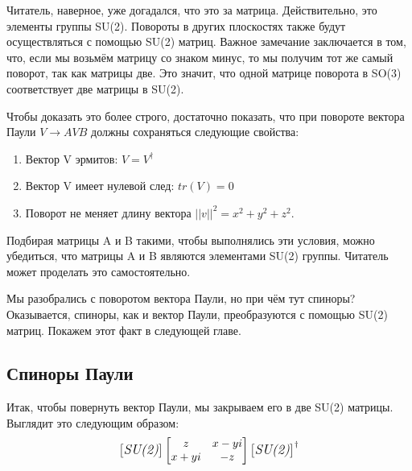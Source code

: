 Читатель, наверное, уже догадался, что это за матрица. Действительно, это элементы группы SU(2). Повороты в других плоскостях также будут осуществляться с помощью SU(2) матриц. Важное замечание заключается в том, что, если мы возьмём матрицу со знаком минус, то мы получим тот же самый поворот, так как матрицы две. Это значит, что одной матрице поворота в SO(3) соответствует две матрицы в SU(2).

Чтобы доказать это более строго, достаточно показать, что при повороте вектора Паули $V \rightarrow AVB$ должны сохраняться следующие свойства:
\begin{enumerate}
    \item Вектор V эрмитов: $V = V^{\dagger}$
    \item Вектор V имеет нулевой след: $tr(V) = 0$
    \item Поворот не меняет длину вектора $||v||^2 = x^2 + y^2 + z^2$.
\end{enumerate}
Подбирая матрицы A и B такими, чтобы выполнялись эти условия, можно убедиться, что матрицы A и B являются элементами SU(2) группы. Читатель может проделать это самостоятельно.

Мы разобрались с поворотом вектора Паули, но при чём тут спиноры? Оказывается, спиноры, как и вектор Паули, преобразуются с помощью SU(2) матриц. Покажем этот факт в следующей главе.

\subsection{Спиноры Паули}
Итак, чтобы повернуть вектор Паули, мы закрываем его в две SU(2) матрицы. Выглядит это следующим образом:
\[
\begin{bmatrix} \textit{\large{SU(2)}} \end{bmatrix} \begin{bmatrix} z & x-yi\\ x + yi & -z \end{bmatrix} \begin{bmatrix} \textit{\large{SU(2)}} \end{bmatrix}^{\dagger}
\]


